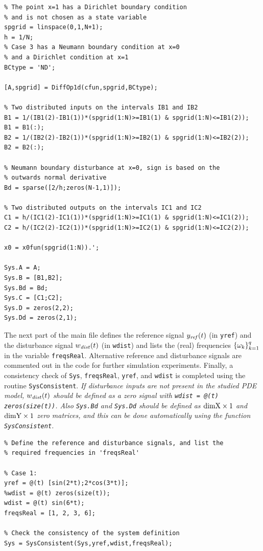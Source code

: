 \documentclass[11pt, a4paper]{amsart}
\theoremstyle{definition}
\numberwithin{equation}{section}
\newcommand{\yref}{y_{\mbox{\scriptsize\textit{ref}}}}
\newcommand{\wdist}{w_{\mbox{\scriptsize\textit{dist}}}}
\begin{document}
\begin{lstlisting}
% The point x=1 has a Dirichlet boundary condition
% and is not chosen as a state variable
spgrid = linspace(0,1,N+1);
h = 1/N;
% Case 3 has a Neumann boundary condition at x=0
% and a Dirichlet condition at x=1
BCtype = 'ND';

[A,spgrid] = DiffOp1d(cfun,spgrid,BCtype);

% Two distributed inputs on the intervals IB1 and IB2
B1 = 1/(IB1(2)-IB1(1))*(spgrid(1:N)>=IB1(1) & spgrid(1:N)<=IB1(2));
B1 = B1(:);
B2 = 1/(IB2(2)-IB2(1))*(spgrid(1:N)>=IB2(1) & spgrid(1:N)<=IB2(2));
B2 = B2(:);

% Neumann boundary disturbance at x=0, sign is based on the
% outwards normal derivative
Bd = sparse([2/h;zeros(N-1,1)]); 

% Two distributed outputs on the intervals IC1 and IC2
C1 = h/(IC1(2)-IC1(1))*(spgrid(1:N)>=IC1(1) & spgrid(1:N)<=IC1(2));
C2 = h/(IC2(2)-IC2(1))*(spgrid(1:N)>=IC2(1) & spgrid(1:N)<=IC2(2));

x0 = x0fun(spgrid(1:N)).';

Sys.A = A;
Sys.B = [B1,B2];
Sys.Bd = Bd;
Sys.C = [C1;C2];
Sys.D = zeros(2,2);
Sys.Dd = zeros(2,1);
  \end{lstlisting}

The next part of the main file defines the reference signal $\yref(t)$ (in \texttt{yref}) and the disturbance signal $\wdist(t)$ (in \texttt{wdist}) and lists the (real) frequencies $\{\omega_k\}_{k=1}^q$ in the variable \texttt{freqsReal}. Alternative reference and disturbance signals are commented out in the code for further simulation experiments.
Finally, a consistency check of \texttt{Sys}, \texttt{freqsReal}, \texttt{yref}, and \texttt{wdist} is completed using the routine \texttt{SysConsistent}.
\emph{If disturbance inputs are not present in the studied PDE model, $\wdist(t)$ should be defined as a zero signal with \textup{\texttt{wdist = @(t) zeros(size(t))}}. Also \textup{\texttt{Sys.Bd}} and \textup{\texttt{Sys.Dd}} should be defined as $\textup{dimX}\times 1$ and $\textup{dimY}\times 1$ zero matrices, and this can be done automatically using the function \textup{\texttt{SysConsistent}}.}

\begin{lstlisting}
% Define the reference and disturbance signals, and list the
% required frequencies in 'freqsReal'

% Case 1:
yref = @(t) [sin(2*t);2*cos(3*t)];
%wdist = @(t) zeros(size(t));
wdist = @(t) sin(6*t);
freqsReal = [1, 2, 3, 6];

% Check the consistency of the system definition
Sys = SysConsistent(Sys,yref,wdist,freqsReal);
\end{lstlisting}
\end{document}
